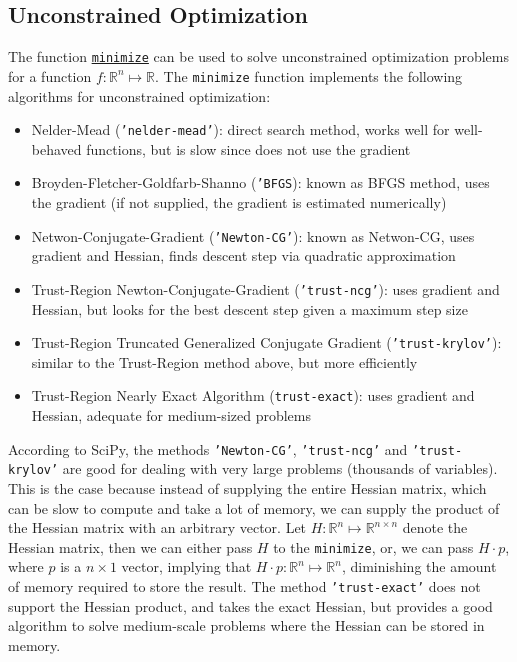 \documentclass[12pt, a4paper]{article}
\begin{document}
\subsection{Unconstrained Optimization}
\label{sec:orga894fc8}
The function \href{https://docs.scipy.org/doc/scipy-1.3.0/reference/generated/scipy.optimize.minimize.html\#scipy-optimize-minimize}{\texttt{minimize}} can be used to solve unconstrained optimization problems for a function \(f:\mathbb{R}^n\mapsto\mathbb{R}\).
The \texttt{minimize} function implements the following algorithms for unconstrained optimization:
\begin{itemize}
\item Nelder-Mead (\texttt{'nelder-mead'}): direct search method, works well for well-behaved functions, but is slow since does not use the gradient
\item Broyden-Fletcher-Goldfarb-Shanno (\texttt{'BFGS}): known as BFGS method, uses the gradient (if not supplied, the gradient is estimated numerically)
\item Netwon-Conjugate-Gradient (\texttt{'Newton-CG'}): known as Netwon-CG, uses gradient and Hessian, finds descent step via quadratic approximation
\item Trust-Region Newton-Conjugate-Gradient (\texttt{'trust-ncg'}): uses gradient and Hessian, but looks for the best descent step given a maximum step size
\item Trust-Region Truncated Generalized Conjugate Gradient (\texttt{'trust-krylov'}): similar to the Trust-Region method above, but more efficiently
\item Trust-Region Nearly Exact Algorithm (\texttt{trust-exact}): uses gradient and Hessian, adequate for medium-sized problems
\end{itemize}
According to SciPy, the methods \texttt{'Newton-CG'}, \texttt{'trust-ncg'} and \texttt{'trust-krylov'} are good for dealing with very large problems (thousands of variables).
This is the case because instead of supplying the entire Hessian matrix, which can be slow to compute and take a lot of memory, we can supply the product of the Hessian matrix with an arbitrary vector.
Let \(H:\mathbb{R}^n\mapsto\mathbb{R}^{n\times n}\) denote the Hessian matrix, then we can either pass \(H\) to the \texttt{minimize}, or, we can pass \(H\cdot p\), where \(p\) is a \(n\times 1\) vector, implying that \(H\cdot p:\mathbb{R}^n\mapsto\mathbb{R}^n\), diminishing the amount of memory required to store the result.
The method \texttt{'trust-exact'} does not support the Hessian product, and takes the exact Hessian, but provides a good algorithm to solve medium-scale problems where the Hessian can be stored in memory.
\end{document}
